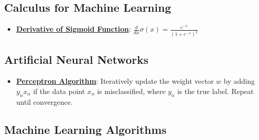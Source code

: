 \documentclass{article}%
\begin{document}
%
\subsection{Calculus for Machine Learning}%
\label{subsec:CalculusforMachineLearning}%
\begin{itemize}[leftmargin=*]%
\item \href{https://purdue.brightspace.com/d2l/common/assets/pdfjs-d2l-dist/1.0.14-legacy/web/viewer.html?file=%2Fcontent%2Fenforced%2F1095467-wl.202510.CS.24300.001%2F04L1-Linear Algebra Primer.pdf%3Fou%3D1095467&lang=en-us&container=d2l-fileviewer-rendered-pdf&fullscreen=d2l-fileviewer-rendered-pdf-dialog&height=667#page=21}{\textbf{Derivative of Sigmoid Function}}: $\frac{d}{dx} \sigma(x) = \frac{e^{-x}}{(1 + e^{-x})^2}$%
\end{itemize}

%
\subsection{Artificial Neural Networks}%
\label{subsec:ArtificialNeuralNetworks}%
\begin{itemize}[leftmargin=*]%
\item \href{https://purdue.brightspace.com/d2l/common/assets/pdfjs-d2l-dist/1.0.14-legacy/web/viewer.html?file=%2Fcontent%2Fenforced%2F1095467-wl.202510.CS.24300.001%2F05L2-ML Basics.pdf%3Fou%3D1095467&lang=en-us&container=d2l-fileviewer-rendered-pdf&fullscreen=d2l-fileviewer-rendered-pdf-dialog&height=667#page=30}{\textbf{Perceptron Algorithm}}: Iteratively update the weight vector $w$ by adding $y_nx_n$ if the data point $x_n$ is misclassified, where $y_n$ is the true label. Repeat until convergence.%
\end{itemize}

%
\subsection{Machine Learning Algorithms}%
\label{subsec:MachineLearningAlgorithms}%
\begin{itemize}[leftmargin=*]%
%
\end{itemize}

%
\end{document}
